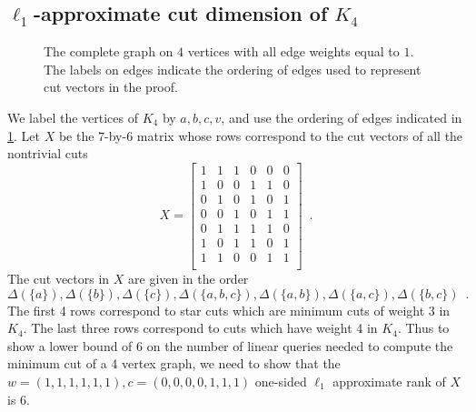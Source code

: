 \subsection{$\ell_1$-approximate cut dimension of $K_4$}
\begin{figure}
\centering
{}
\caption{The complete graph on $4$ vertices with all edge weights equal to $1$.  The labels on edges indicate the
ordering of edges used to represent cut vectors in the proof.}
\label{fig:K4}
\end{figure}

We label the vertices of $K_4$ by $a,b,c,v$, and
use the ordering of edges indicated in \cref{fig:K4}.
Let $X$ be the $7$-by-$6$ matrix whose rows correspond to the cut vectors of all the nontrivial cuts
\begin{equation}
\label{eq:baseX}
X =
\begin{bmatrix}
1 &  1 &  1 &  0 &  0 &  0 \\
1 &  0 &  0 &  1 &  1 &  0 \\
0 &  1 &  0 &  1 &  0 &  1 \\
0 &  0 &  1 &  0 &  1 &  1 \\
0 &  1 &  1 &  1 &  1 &  0 \\
1 &  0 &  1 &  1 &  0 &  1 \\
1 &  1 &  0 &  0 &  1 &  1 \\
\end{bmatrix}
\enspace .
\end{equation}
The cut vectors in $X$ are given in the order
\[
\Delta(\{a\}), \Delta(\{b\}), \Delta(\{c\}), \Delta(\{a,b,c\}), \Delta(\{a,b\}), \Delta(\{a,c\}), \Delta(\{b,c\}) \enspace.
\]
The first 4 rows correspond to star cuts which are minimum cuts of weight 3 in $K_4$.  The last three rows correspond to cuts which have weight 4 in $K_4$.
Thus to show a lower bound of $6$ on the number of linear queries needed to compute the minimum
cut of a 4 vertex graph, we need to show that the $w=(1,1,1,1,1,1), c=(0,0,0,0,1,1,1)$ one-sided $\ell_1$ approximate rank of $X$ is 6.

